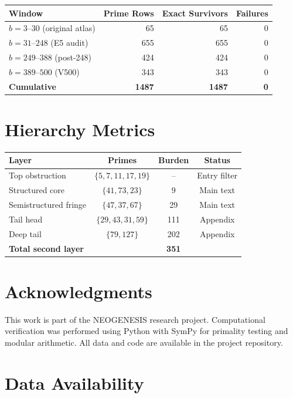 \documentclass[11pt,letterpaper]{article}
\begin{document}
\begin{center}
\begin{tabular}{@{}lrrr@{}}
\toprule
Window & Prime Rows & Exact Survivors & Failures \\
\midrule
$b = 3$--$30$ (original atlas) & 65 & 65 & 0 \\
$b = 31$--$248$ (E5 audit) & 655 & 655 & 0 \\
$b = 249$--$388$ (post-248) & 424 & 424 & 0 \\
$b = 389$--$500$ (V500) & 343 & 343 & 0 \\
\midrule
\textbf{Cumulative} & \textbf{1487} & \textbf{1487} & \textbf{0} \\
\bottomrule
\end{tabular}
\end{center}

\section{Hierarchy Metrics}\label{app:metrics}

\begin{center}
\begin{tabular}{@{}lccc@{}}
\toprule
Layer & Primes & Burden & Status \\
\midrule
Top obstruction & $\{5,7,11,17,19\}$ & -- & Entry filter \\
Structured core & $\{41,73,23\}$ & 9 & Main text \\
Semistructured fringe & $\{47,37,67\}$ & 29 & Main text \\
Tail head & $\{29,43,31,59\}$ & 111 & Appendix \\
Deep tail & $\{79,127\}$ & 202 & Appendix \\
\midrule
\textbf{Total second layer} & & \textbf{351} & \\
\bottomrule
\end{tabular}
\end{center}

\section*{Acknowledgments}

This work is part of the NEOGENESIS research project.
Computational verification was performed using Python with SymPy for primality testing and modular arithmetic.
All data and code are available in the project repository.

\section*{Data Availability}
\end{document}
